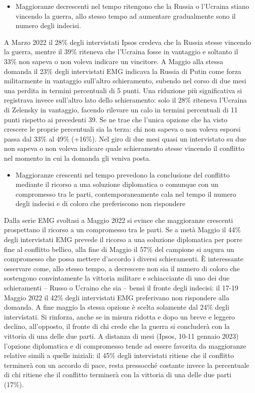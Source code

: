\documentclass[
]{book}
\providecommand{\tightlist}{%
  \setlength{\itemsep}{0pt}\setlength{\parskip}{0pt}}
\begin{document}
\begin{itemize}
\tightlist
\item
  Maggioranze decrescenti nel tempo ritengono che la Russia o l'Ucraina stiano vincendo la guerra, allo stesso tempo ad aumentare gradualmente sono il numero degli indecisi.
\end{itemize}

A Marzo 2022 il 28\% degli intervistati Ipsos credeva che la Russia stesse vincendo la guerra, mentre il 39\% riteneva che l'Ucraina fosse in vantaggio e soltanto il 33\% non sapeva o non voleva indicare un vincitore. A Maggio alla stessa domanda il 23\% degli intervistati EMG indicava la Russia di Putin come forza militarmente in vantaggio sull'altro schieramento, subendo nel corso di due mesi una perdita in termini percentuali di 5 punti. Una riduzione più significativa si registrava invece sull'altro lato dello schieramento: solo il 28\% riteneva l'Ucraina di Zelensky in vantaggio, facendo rilevare un calo in termini percentuali di 11 punti rispetto ai precedenti 39. Se ne trae che l'unica opzione che ha visto crescere le proprie percentuali sia la terza: chi non sapeva o non voleva esporsi passa dal 33\% al 49\% (+16\%). Nel giro di due mesi quasi un intervistato su due non sapeva o non voleva indicare quale schieramento stesse vincendo il conflitto nel momento in cui la domanda gli veniva posta.

\begin{itemize}
\tightlist
\item
  Maggioranze crescenti nel tempo prevedono la conclusione del conflitto mediante il ricorso a una soluzione diplomatica o comunque con un compromesso tra le parti, contemporaneamente cala nel tempo il numero degli indecisi e di coloro che preferiscono non rispondere
\end{itemize}

Dalla serie EMG svoltasi a Maggio 2022 si evince che maggioranze crescenti prospettano il ricorso a un compromesso tra le parti. Se a metà Maggio il 44\% degli intervistati EMG prevede il ricorso a una soluzione diplomatica per porre fine al conflitto bellico, alla fine di Maggio il 57\% del campione si augura un compromesso che possa mettere d'accordo i diversi schieramenti. È interessante osservare come, allo stesso tempo, a decrescere non sia il numero di coloro che sostengono convintamente la vittoria militare e schiacciante di uno dei due schieramenti -- Russo o Ucraino che sia -- bensì il fronte degli indecisi: il 17-19 Maggio 2022 il 42\% degli intervistati EMG preferivano non rispondere alla domanda. A fine maggio la stessa opzione è scelta solamente dal 24\% degli intervistati. Si rinforza, anche se in misura ridotta e dopo un breve e leggero declino, all'opposto, il fronte di chi crede che la guerra si concluderà con la vittoria di una delle due parti. A distanza di mesi (Ipsos, 10-11 gennaio 2023) l'opzione diplomatica e di compromesso tende ad essere favorita da maggioranze relative simili a quelle iniziali: il 45\% degli intervistati ritiene che il conflitto terminerà con un accordo di pace, resta pressocché costante invece la percentuale di chi ritiene che il conflitto terminerà con la vittoria di una delle due parti (17\%).
\end{document}
